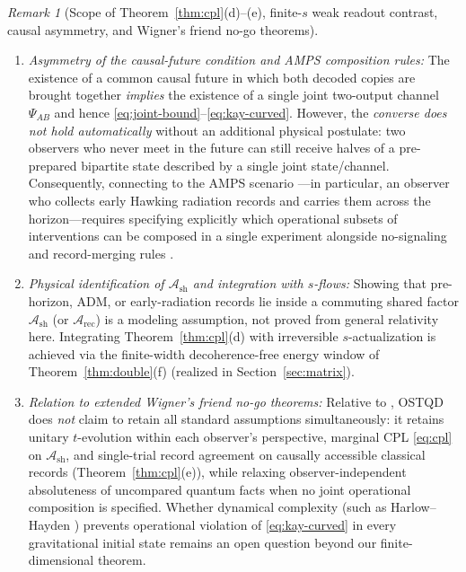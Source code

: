 \documentclass[11pt,a4paper]{article}
\theoremstyle{definition}
\theoremstyle{remark}
\newtheorem{remark}{Remark}
\newcommand{\cA}{\mathcal{A}}
\newcommand{\1}{\mathbf{1}}
\begin{document}
\begin{remark}[Scope of Theorem~\ref{thm:cpl}(d)--(e), finite-$s$ weak readout contrast, causal asymmetry, and Wigner's friend no-go theorems]
\begin{enumerate}
  \item \emph{Asymmetry of the causal-future condition and AMPS composition rules:} The existence of a common causal future in which both decoded copies are brought together \emph{implies} the existence of a single joint two-output channel $\Psi_{AB}$ and hence \eqref{eq:joint-bound}--\eqref{eq:kay-curved}. However, the \emph{converse does not hold automatically} without an additional physical postulate: two observers who never meet in the future can still receive halves of a pre-prepared bipartite state described by a single joint state/channel. Consequently, connecting to the AMPS scenario \cite[\S 2]{AMPS2013}---in particular, an observer who collects early Hawking radiation records and carries them across the horizon---requires specifying explicitly which operational subsets of interventions can be composed in a single experiment alongside no-signaling and record-merging rules \cite{HausmannRenner2025,Walleghem2025,Adlam2026}.
  \item \emph{Physical identification of $\cA_{\mathrm{sh}}$ and integration with $s$-flows:} Showing that pre-horizon, ADM, or early-radiation records lie inside a commuting shared factor $\cA_{\mathrm{sh}}$ (or $\cA_{\mathrm{rec}}$) is a modeling assumption, not proved from general relativity here. Integrating Theorem~\ref{thm:cpl}(d) with irreversible $s$-actualization is achieved via the finite-width decoherence-free energy window of Theorem~\ref{thm:double}(f) (realized in Section~\ref{sec:matrix}).
  \item \emph{Relation to extended Wigner's friend no-go theorems:} Relative to \cite{FrauchigerRenner2018,Bong2020,HausmannRenner2025,Walleghem2025,Adlam2026}, OSTQD does \emph{not} claim to retain all standard assumptions simultaneously: it retains unitary $t$-evolution within each observer's perspective, marginal CPL \eqref{eq:cpl} on $\cA_{\mathrm{sh}}$, and single-trial record agreement on causally accessible classical records (Theorem~\ref{thm:cpl}(e)), while relaxing observer-independent absoluteness of uncompared quantum facts when no joint operational composition is specified. Whether dynamical complexity (such as Harlow--Hayden \cite{HarlowHayden2013}) prevents operational violation of \eqref{eq:kay-curved} in every gravitational initial state remains an open question beyond our finite-dimensional theorem.
\end{enumerate}
\end{remark}

\end{document}
